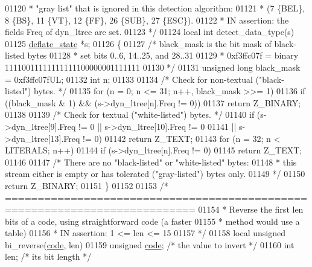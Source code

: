 \begin{DoxyCode}
{{{{{{{{{{{{{{{{{{{{{{{{01120 \textcolor{comment}{ *   "gray list" that is ignored in this detection algorithm:}
01121 \textcolor{comment}{ *   (7 \{BEL\}, 8 \{BS\}, 11 \{VT\}, 12 \{FF\}, 26 \{SUB\}, 27 \{ESC\}).}
01122 \textcolor{comment}{ * IN assertion: the fields Freq of dyn\_ltree are set.}
01123 \textcolor{comment}{ */}
01124 local \textcolor{keywordtype}{int} detect\_data\_type(s)
01125     \hyperlink{structinternal__state}{deflate\_state} *s;
01126 \{
01127     \textcolor{comment}{/* black\_mask is the bit mask of black-listed bytes}
01128 \textcolor{comment}{     * set bits 0..6, 14..25, and 28..31}
01129 \textcolor{comment}{     * 0xf3ffc07f = binary 11110011111111111100000001111111}
01130 \textcolor{comment}{     */}
01131     \textcolor{keywordtype}{unsigned} \textcolor{keywordtype}{long} black\_mask = 0xf3ffc07fUL;
01132     \textcolor{keywordtype}{int} n;
01133 
01134     \textcolor{comment}{/* Check for non-textual ("black-listed") bytes. */}
01135     \textcolor{keywordflow}{for} (n = 0; n <= 31; n++, black\_mask >>= 1)
01136         \textcolor{keywordflow}{if} ((black\_mask & 1) && (s->dyn\_ltree[n].Freq != 0))
01137             \textcolor{keywordflow}{return} Z\_BINARY;
01138 
01139     \textcolor{comment}{/* Check for textual ("white-listed") bytes. */}
01140     \textcolor{keywordflow}{if} (s->dyn\_ltree[9].Freq != 0 || s->dyn\_ltree[10].Freq != 0
01141             || s->dyn\_ltree[13].Freq != 0)
01142         \textcolor{keywordflow}{return} Z\_TEXT;
01143     \textcolor{keywordflow}{for} (n = 32; n < LITERALS; n++)
01144         \textcolor{keywordflow}{if} (s->dyn\_ltree[n].Freq != 0)
01145             \textcolor{keywordflow}{return} Z\_TEXT;
01146 
01147     \textcolor{comment}{/* There are no "black-listed" or "white-listed" bytes:}
01148 \textcolor{comment}{     * this stream either is empty or has tolerated ("gray-listed") bytes only.}
01149 \textcolor{comment}{     */}
01150     \textcolor{keywordflow}{return} Z\_BINARY;
01151 \}
01152 
01153 \textcolor{comment}{/* ===========================================================================}
01154 \textcolor{comment}{ * Reverse the first len bits of a code, using straightforward code (a faster}
01155 \textcolor{comment}{ * method would use a table)}
01156 \textcolor{comment}{ * IN assertion: 1 <= len <= 15}
01157 \textcolor{comment}{ */}
01158 local \textcolor{keywordtype}{unsigned} bi\_reverse(\hyperlink{structcode}{code}, len)
01159     \textcolor{keywordtype}{unsigned} \hyperlink{structcode}{code}; \textcolor{comment}{/* the value to invert */}
01160     \textcolor{keywordtype}{int} len;       \textcolor{comment}{/* its bit length */}
}}}}}}}}}}}}}}}}}}}}}}}}
\end{DoxyCode}
